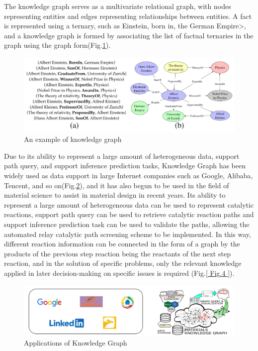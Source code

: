 \documentclass[%
 aip,
 jmp,%
 amsmath,amssymb,
 reprint,%
]{revtex4-2}
\begin{document}
The knowledge graph serves as a multivariate relational graph, with nodes representing entities and edges representing relationships between entities. A fact is represented using a ternary, such as Einstein, born in, the German Empire>, and a knowledge graph is formed by associating the list of factual ternaries in the graph using the graph form(Fig.\ref{ Fig.2 }).

\begin{figure}[htbp]
    \centering
    \includegraphics[width=1\textwidth]{figure/2.png}
    \caption{ An example of knowledge graph }
    \label{ Fig.2 }
\end{figure}

Due to its ability to represent a large amount of heterogeneous data, support path query, and support inference prediction tasks, Knowledge Graph has been widely used as data support in large Internet companies such as Google\cite{akerkar2009knowledge}, Alibaba\cite{li2020alimekg}, Tencent\cite{TencentKG}, and so on(Fig.\ref{ Fig.3 }), and it has also begun to be used in the field of material science to assist in material design in recent years\cite{mrdjenovich2020propnet, mccusker2020nanomine, zhao2021knowledge}. Its ability to represent a large amount of heterogeneous data can be used to represent catalytic reactions, support path query can be used to retrieve catalytic reaction paths and support inference prediction task can be used to validate the paths, allowing the automated relay catalytic path screening scheme to be implemented. In this way, different reaction information can be connected in the form of a graph by the products of the previous step reaction being the reactants of the next step reaction, and in the solution of specific problems, only the relevant knowledge applied in later decision-making on specific issues is required (Fig.\ref{ Fig.4 }).

\begin{figure}[htbp]
 \centering
 \includegraphics[width=1\textwidth]{figure/3.png}
 \caption{ Applications of Knowledge Graph }
 \label{ Fig.3 }
\end{figure}
\end{document}
